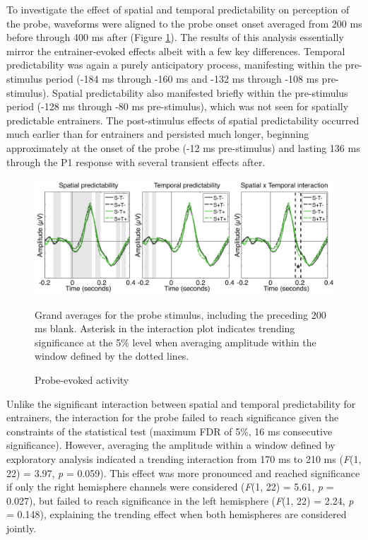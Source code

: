 \documentclass[dwyatte_dissertation.tex]{subfiles}
\begin{document}
To investigate the effect of spatial and temporal predictability on perception of the probe, waveforms were aligned to the probe onset onset averaged from 200 ms before through 400 ms after (Figure \ref{fig:pleast_probe_tla}). The results of this analysis essentially mirror the entrainer-evoked effects albeit with a few key differences. Temporal predictability was again a purely anticipatory process, manifesting within the pre-stimulus period (-184 ms through -160 ms and -132 ms through -108 ms pre-stimulus). Spatial predictability also manifested briefly within the pre-stimulus period (-128 ms through -80 ms pre-stimulus), which was not seen for spatially predictable entrainers. The post-stimulus effects of spatial predictability occurred much earlier than for entrainers and persisted much longer, beginning approximately at the onset of the probe (-12 ms pre-stimulus) and lasting 136 ms through the P1 response with several transient effects after.

\begin{figure}[h!]
\begin{center}
\includegraphics[width=160mm]{figs/chap_pleast/results_probe_tla_All_montage.pdf}
\end{center}
\caption{Probe-evoked activity}{Grand averages for the probe stimulus, including the preceding 200 ms blank. Asterisk in the interaction plot indicates trending significance at the 5\% level when averaging amplitude within the window defined by the dotted lines.}
\label{fig:pleast_probe_tla}
\end{figure}

Unlike the significant interaction between spatial and temporal predictability for entrainers, the interaction for the probe failed to reach significance given the constraints of the statistical test (maximum FDR of 5\%, 16 ms consecutive significance). However, averaging the amplitude within a window defined by exploratory analysis indicated a trending interaction from 170 ms to 210 ms (\textit{F}(1, 22) = 3.97, \textit{p} = 0.059). This effect was more pronounced and reached significance if only the right hemisphere channels were considered (\textit{F}(1, 22) = 5.61, \textit{p} = 0.027), but failed to reach significance in the left hemisphere (\textit{F}(1, 22) = 2.24, \textit{p} = 0.148), explaining the trending effect when both hemispheres are considered jointly.
\end{document}
